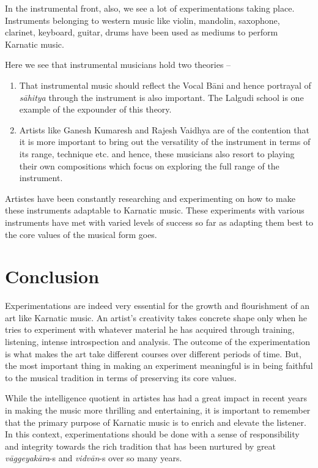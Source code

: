 In the instrumental front, also, we see a lot of experimentations taking place. Instruments belonging to western music like violin, mandolin, saxophone, clarinet, keyboard, guitar, drums have been used as mediums to perform Karnatic music.

Here we see that instrumental musicians hold two theories –

\begin{enumerate}
\itemsep=0pt

 \item That instrumental music should reflect the Vocal Bāni and hence portrayal of \textit{sāhitya} through the instrument is also important. The Lalgudi school is one example of the expounder of this theory.

 \item Artists like Ganesh Kumaresh and Rajesh Vaidhya are of the contention that it is more important to bring out the versatility of the instrument in terms of its range, technique etc. and hence, these musicians also resort to playing their own compositions which focus on exploring the full range of the instrument.

\end{enumerate}

Artistes have been constantly researching and experimenting on how to make these instruments adaptable to Karnatic music. These experiments with various instruments have met with varied levels of success so far as adapting them best to the core values of the musical form goes.


\section*{Conclusion}

Experimentations are indeed very essential for the growth and flourishment of an art like Karnatic music. An artist’s creativity takes concrete shape only when he tries to experiment with whatever material he has acquired through training, listening, intense introspection and analysis. The outcome of the experimentation is what makes the art take different courses over different periods of time. But, the most important thing in making an experiment meaningful is in being faithful to the musical tradition in terms of preserving its core values.

While the intelligence quotient in artistes has had a great impact in recent years in making the music more thrilling and entertaining, it is important to remember that the primary purpose of Karnatic music is to enrich and elevate the listener. In this context, experimentations should be done with a sense of responsibility and integrity towards the rich tradition that has been nurtured by great \textit{vāggeyakāra}-s and \textit{vidvān}-s over so many years.

